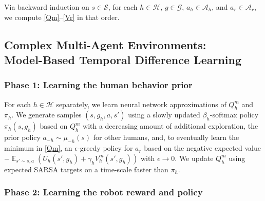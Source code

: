 \documentclass[letterpaper]{article} %
\DeclareMathOperator*{\E}{\mathbb{E}}
\def\A{\mathcal{A}}
\def\G{\mathcal{G}}
\def\H{\mathcal{H}}
\def\S{\mathcal{S}}
\begin{document}

Via backward induction on $s\in\S$, for each $h\in\H$, $g\in\G$, $a_h\in\A_h$, and $a_r\in\A_r$, we compute \eqref{Qm}--\eqref{Vr} in that order.


\subsection{Complex Multi-Agent Environments:\\ Model-Based Temporal Difference Learning}


\subsubsection{Phase 1: Learning the human behavior prior}
For each $h\in\H$ separately, we learn neural network approximations of $Q^m_h$ and $\pi_h$.
We generate samples $(s,g_h,a,s')$ using a slowly updated $\beta_h$-softmax policy $\pi_h(s,g_h)$ based on $Q_h^m$ with a decreasing amount of additional exploration,
the prior policy $a_{-h}\sim\mu_{-h}(s)$ for other humans, 
and, to eventually learn the minimum in \eqref{Qm}, an $\epsilon$-greedy policy for $a_r$ based on the negative expected value $-\E_{s'\sim s,a} (U_h(s',g_h) + \gamma_h V^m_h(s',g_h))$ with $\epsilon\to 0$.
We update $Q^m_h$ using expected SARSA targets on a time-scale faster than $\pi_h$. 


\subsubsection{Phase 2: Learning the robot reward and policy}
\end{document}
